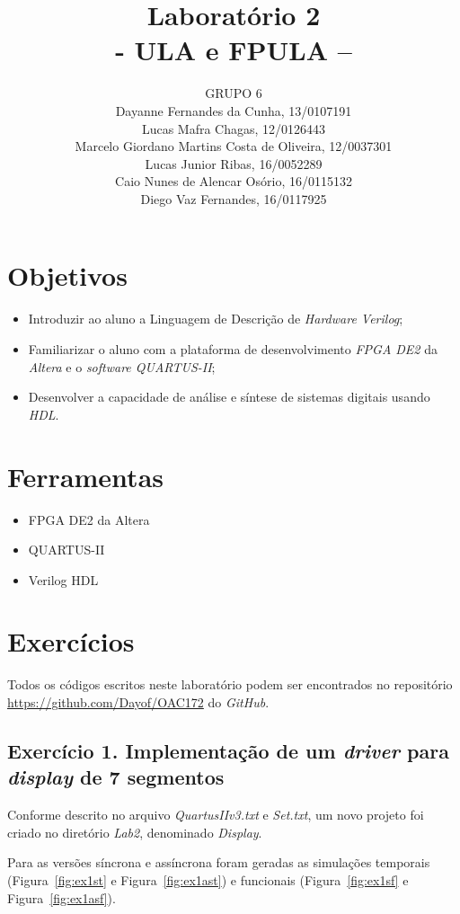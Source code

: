 \documentclass[12pt]{article}
\title{Laboratório 2\\- ULA e FPULA –}
\author{GRUPO 6\\
	Dayanne Fernandes da Cunha, 13/0107191\\
	Lucas Mafra Chagas, 12/0126443\\
	Marcelo Giordano Martins Costa de Oliveira, 12/0037301\\
	Lucas Junior Ribas, 16/0052289\\
	Caio Nunes de Alencar Osório, 16/0115132\\
	Diego Vaz Fernandes, 16/0117925}
\begin{document}
\maketitle

\section{Objetivos}
\label{sec:Objetivos}

\begin{itemize}
\item Introduzir ao aluno a Linguagem de Descrição de \textit{Hardware Verilog};
\item Familiarizar o aluno com a plataforma de desenvolvimento \textit{FPGA DE2} da \textit{Altera} e o \textit{software QUARTUS-II};
\item Desenvolver a capacidade de análise e síntese de sistemas digitais usando \textit{HDL}.
\end{itemize}

\section{Ferramentas}
\label{sec:Materiais}

\begin{itemize}
\item FPGA DE2 da Altera 
\item QUARTUS-II
\item Verilog HDL
\end{itemize}

\section{Exercícios}
\label{sec:exercicios}

Todos os códigos escritos neste laboratório podem ser encontrados no repositório \url{https://github.com/Dayof/OAC172} do \textit{GitHub}.

\subsection{Exercício 1. Implementação de um \textit{driver} para \textit{display} de 7 segmentos}
\label{subsec:1driver}

Conforme descrito no arquivo \textit{QuartusIIv3.txt} e \textit{Set.txt}, um novo projeto foi criado no diretório \textit{Lab2}, denominado \textit{Display}. 

Para as versões síncrona e assíncrona foram geradas as simulações temporais (Figura~\ref{fig:ex1st} e Figura~\ref{fig:ex1ast}) e funcionais (Figura~\ref{fig:ex1sf} e Figura~\ref{fig:ex1asf}).
\end{document}
